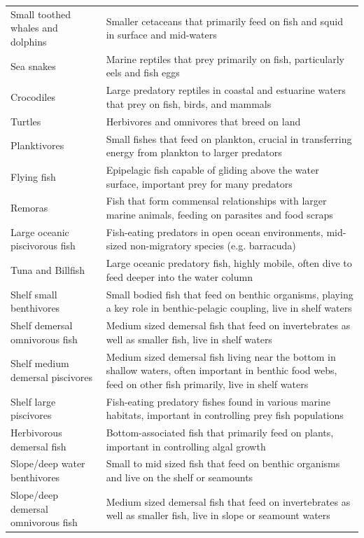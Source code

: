 \begin{longtable}{p{}p{}}
  Small toothed whales and dolphins & Smaller cetaceans that primarily feed on fish and squid in surface and mid-waters \\
  Sea snakes & Marine reptiles that prey primarily on fish, particularly eels and fish eggs \\
  Crocodiles & Large predatory reptiles in coastal and estuarine waters that prey on fish, birds, and mammals \\
  Turtles & Herbivores and omnivores that breed on land \\
  Planktivores & Small fishes that feed on plankton, crucial in transferring energy from plankton to larger predators \\
  Flying fish & Epipelagic fish capable of gliding above the water surface, important prey for many predators \\
  Remoras & Fish that form commensal relationships with larger marine animals, feeding on parasites and food scraps \\
  Large oceanic piscivorous fish & Fish-eating predators in open ocean environments, mid-sized non-migratory species (e.g. barracuda) \\
  Tuna and Billfish & Large oceanic predatory fish, highly mobile, often dive to feed deeper into the water column \\
  Shelf small benthivores & Small bodied fish that feed on benthic organisms, playing a key role in benthic-pelagic coupling, live in shelf waters \\
  Shelf demersal omnivorous fish & Medium sized demersal fish that feed on invertebrates as well as smaller fish, live in shelf waters \\
  Shelf medium demersal piscivores & Medium sized demersal fish living near the bottom in shallow waters, often important in benthic food webs, feed on other fish primarily, live in shelf waters \\
  Shelf large piscivores & Fish-eating predatory fishes found in various marine habitats, important in controlling prey fish populations \\
  Herbivorous demersal fish & Bottom-associated fish that primarily feed on plants, important in controlling algal growth \\
  Slope/deep water benthivores & Small to mid sized fish that feed on benthic organisms and live on the shelf or seamounts \\
  Slope/deep demersal omnivorous fish & Medium sized demersal fish that feed on invertebrates as well as smaller fish, live in slope or seamount waters \\

\end{longtable}
